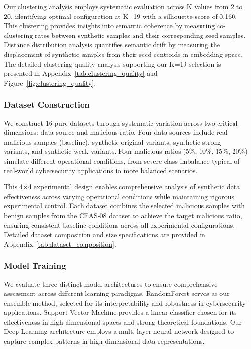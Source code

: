 Our clustering analysis employs systematic evaluation across K values from 2 to 20, identifying optimal configuration at K=19 with a silhouette score of 0.160. This clustering provides insights into semantic coherence by measuring co-clustering rates between synthetic samples and their corresponding seed samples. Distance distribution analysis quantifies semantic drift by measuring the displacement of synthetic samples from their seed centroids in embedding space. The detailed clustering quality analysis supporting our K=19 selection is presented in Appendix~\ref{tab:clustering_quality} and Figure~\ref{fig:clustering_quality}.


\subsubsection{Dataset Construction}

We construct 16 pure datasets through systematic variation across two critical dimensions: data source and malicious ratio. Four data sources include real malicious samples (baseline), synthetic original variants, synthetic strong variants, and synthetic weak variants. Four malicious ratios (5\%, 10\%, 15\%, 20\%) simulate different operational conditions, from severe class imbalance typical of real-world cybersecurity applications to more balanced scenarios.

This 4×4 experimental design enables comprehensive analysis of synthetic data effectiveness across varying operational conditions while maintaining rigorous experimental control. Each dataset combines the selected malicious samples with benign samples from the CEAS-08 dataset to achieve the target malicious ratio, ensuring consistent baseline conditions across all experimental configurations. Detailed dataset composition and size specifications are provided in Appendix~\ref{tab:dataset_composition}.

\subsubsection{Model Training}

We evaluate three distinct model architectures to ensure comprehensive assessment across different learning paradigms. RandomForest serves as our ensemble method, selected for its interpretability and robustness in cybersecurity applications. Support Vector Machine provides a linear classifier chosen for its effectiveness in high-dimensional spaces and strong theoretical foundations. Our Deep Learning architecture employs a multi-layer neural network designed to capture complex patterns in high-dimensional data representations.

